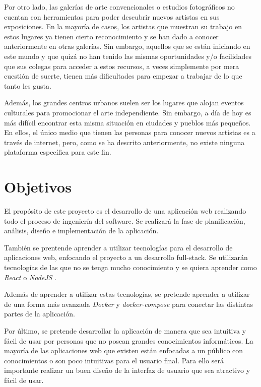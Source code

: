 Por otro lado, las galerías de arte convencionales o estudios fotográficos no cuentan con
herramientas para poder descubrir nuevos artistas en sus exposiciones. En la mayoría de casos,
los artistas que muestran su trabajo en estos lugares ya tienen cierto reconocimiento y se
han dado a conocer anteriormente en otras galerías. Sin embargo, aquellos que se están
iniciando en este mundo y que quizá no han tenido las mismas oportunidades y/o facilidades
que sus colegas para acceder a estos recursos, a veces simplemente por mera cuestión de
suerte, tienen más dificultades para empezar a trabajar de lo que tanto les gusta.  

Además, los grandes centros urbanos suelen ser los lugares que alojan eventos culturales para
promocionar el arte independiente. Sin embargo, a día de hoy es más difícil encontrar esta
misma situación en ciudades y pueblos más pequeños. En ellos, el único medio que tienen las
personas para conocer nuevos artistas es a través de internet, pero, como se ha descrito
anteriormente, no existe ninguna plataforma específica para este fin.

\section{Objetivos}

El propósito de este proyecto es el desarrollo de una aplicación web realizando todo
el proceso de ingeniería del software. Se realizará la fase de planificación, análisis,
diseño e implementación de la aplicación.

También se prentende aprender a utilizar tecnologías para el desarrollo de aplicaciones
web, enfocando el proyecto a un desarrollo full-stack. Se utilizarán tecnologías de las
que no se tenga mucho conocimiento y se quiera aprender como \textit{React} \cite{react}
o \textit{NodeJS} \cite{nodejs}.

Además de aprender a utilizar estas tecnologías, se pretende aprender a utilizar
de una forma más avanzada \textit{Docker} \cite{docker} y \textit{docker-compose}
\cite{docker-compose} para conectar las distintas partes de la aplicación.

Por último, se pretende desarrollar la aplicación de manera que sea intuitiva y fácil
de usar por personas que no posean grandes conocimientos informáticos. La mayoría de
las aplicaciones web que existen están enfocadas a un público con conocimientos o son
poco intuitivas para el usuario final. Para ello será importante realizar un buen
diseño de la interfaz de usuario que sea atractivo y fácil de usar.

